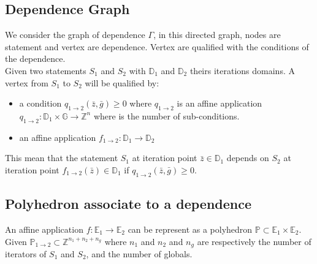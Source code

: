 		\subsection{Dependence Graph}

We consider the graph of dependence $\Gamma$, in this directed graph, nodes are statement and vertex are dependence.
Vertex are qualified with the conditions of the dependence.\\
Given two statements $S_{1}$ and $S_{2}$ with $\mathbb{D}_{1}$ and $\mathbb{D}_{2}$ theirs iterations domains.
A vertex from $S_{1}$ to $S_{2}$ will be qualified by:
\begin{itemize}
	\item a condition $q_{1 \rightarrow 2}(\bar{z}, \bar{g}) \geq 0$ where $q_{1 \rightarrow 2}$ is an affine application
		$q_{1 \rightarrow 2}: \mathbb{D}_{1} \times \mathbb{G} \rightarrow \mathbb{Z}^{n}$ where is the number of
		sub-conditions.
	\item an affine application $f_{1 \rightarrow 2} : \mathbb{D}_{1} \rightarrow \mathbb{D}_{2}$
\end{itemize}
This mean that the statement $S_{1}$ at iteration point $\bar{z} \in \mathbb{D}_{1}$ depends on $S_{2}$ at iteration point
$f_{1 \rightarrow 2}(\bar{z}) \in \mathbb{D}_{1}$ if $q_{1 \rightarrow 2}(\bar{z}, \bar{g}) \geq 0$.\\

		\subsection{Polyhedron associate to a dependence}

An affine application $f: \mathbb{E}_{1} \rightarrow \mathbb{E}_{2}$ can be represent as a polyhedron
$\mathbb{P} \subset \mathbb{E}_{1} \times \mathbb{E}_{2}$.\\
Given $\mathbb{P}_{1 \rightarrow 2} \subset \mathbb{Z}^{n_{1} + n_{2} + n_{g}}$ where $n_{1}$ and $n_{2}$ and $n_{g}$ are
respectively the number of iterators of $S_{1}$ and $S_{2}$, and the number of globals.\\

